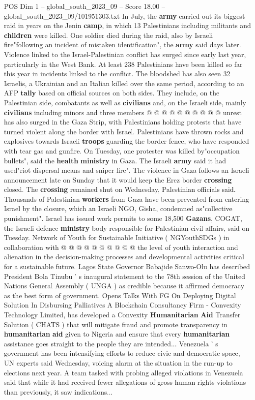 \begin{textsample}{POS Dim 1 – global\_south\_2023\_09 – Score 18.00 – global\_south\_2023\_09/101951303.txt}
In July, the \textbf{army} carried out its biggest raid in years on the Jenin \textbf{camp}, in which 13 Palestinians including militants and \textbf{children} were killed.
One soldier died during the raid, also by Israeli fire"following an incident of mistaken identification", the \textbf{army} said days later.
Violence linked to the Israel-Palestinian conflict has surged since early last year, particularly in the West Bank.
At least 238 Palestinians have been killed so far this year in incidents linked to the conflict.
The bloodshed has also seen 32 Israelis, a Ukrainian and an Italian killed over the same period, according to an AFP \textbf{tally} based on official sources on both sides.
They include, on the Palestinian side, combatants as well as \textbf{civilians} and, on the Israeli side, mainly \textbf{civilians} including minors and three members @ @ @ @ @ @ @ @ @ @ unrest has also surged in the Gaza Strip, with Palestinians holding protests that have turned violent along the border with Israel.
Palestinians have thrown rocks and explosives towards Israeli \textbf{troops} guarding the border fence, who have responded with tear gas and gunfire.
On Tuesday, one protester was killed by"occupation bullets", said the \textbf{health} \textbf{ministry} in Gaza.
The Israeli \textbf{army} said it had used"riot dispersal means and sniper fire".
The violence in Gaza follows an Israeli announcement late on Sunday that it would keep the Erez border \textbf{crossing} closed.
The \textbf{crossing} remained shut on Wednesday, Palestinian officials said.
Thousands of Palestinian \textbf{workers} from Gaza have been prevented from entering Israel by the closure, which an Israeli NGO, Gisha, condemned as"collective punishment".
Israel has issued work permits to some 18,500 \textbf{Gazans}, COGAT, the Israeli defence \textbf{ministry} body responsible for Palestinian civil affairs, said on Tuesday.
Network of Youth for Sustainable Initiative ( NGYouthSDGs ) in collaboration with @ @ @ @ @ @ @ @ @ @ the level of youth interaction and alienation in the decision-making processes and developmental activities critical for a sustainable future.
Lagos State Governor Babajide Sanwo-Olu has described President Bola Tinubu ' s inaugural statement to the 78th session of the United Nations General Assembly ( UNGA ) as credible because it affirmed democracy as the best form of government.
Opens Talks With FG On Deploying Digital Solution In Disbursing Palliatives A Blockchain Consultancy Firm - Convexity Technology Limited, has developed a Convexity \textbf{Humanitarian} \textbf{Aid} Transfer Solution ( CHATS ) that will mitigate fraud and promote transparency in \textbf{humanitarian} \textbf{aid} given to Nigeria and ensure that every \textbf{humanitarian} assistance goes straight to the people they are intended...
Venezuela ' s government has been intensifying efforts to reduce civic and democratic space, UN experts said Wednesday, voicing alarm at the situation in the run-up to elections next year.
A team tasked with probing alleged violations in Venezuela said that while it had received fewer allegations of gross human rights violations than previously, it saw indications...


\end{textsample}
